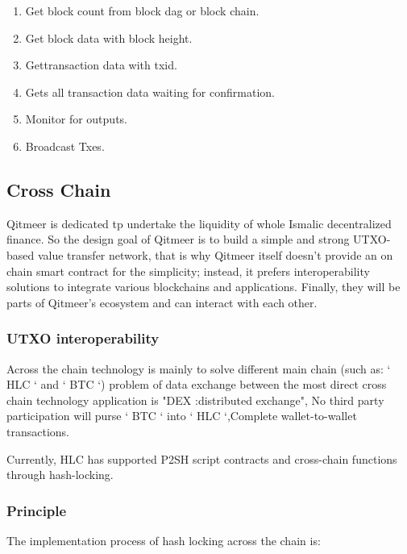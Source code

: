 \documentclass[a4paper,11pt]{article}
\begin{document}
   \begin{enumerate}
    \item  Get block count from block dag or block chain.
    \item Get block data with block height.
    \item  Gettransaction data with txid.
    \item  Gets all transaction data waiting for confirmation.
    \item  Monitor for outputs.
    \item  Broadcast Txes.
   \end{enumerate}


\subsection{Cross Chain}
Qitmeer is dedicated tp undertake the liquidity of whole Ismalic decentralized finance. So the design goal of Qitmeer is to build a simple and strong UTXO-based value transfer network, that is why Qitmeer itself doesn't provide an on chain smart contract for the simplicity; instead, it prefers interoperability solutions to integrate various blockchains and applications. Finally, they will be parts of Qitmeer's ecosystem and can interact with each other. 

\subsubsection{UTXO interoperability}

Across the chain technology is mainly to solve different main chain (such as: ` HLC ` and ` BTC `) problem of data exchange between the most direct cross chain technology application is "DEX :distributed exchange", No third party participation will purse ` BTC ` into ` HLC `,Complete wallet-to-wallet transactions.

Currently, HLC has supported P2SH script contracts and cross-chain functions through hash-locking.

\subsubsection*{Principle}

The implementation process of hash locking across the chain is:
\end{document}
